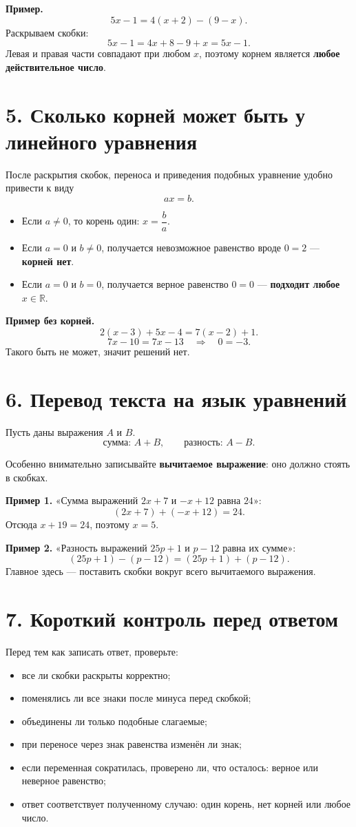 \documentclass[a4paper,12pt]{article}
\newcommand{\sectionline}{\par\vspace{0.1em}{\color{accent}\hrule height 0.6pt}\vspace{0.45em}}
\newcommand{\key}[1]{\textbf{\color{darkaccent}#1}}
\newcommand{\R}{\mathbb{R}}
\begin{document}
\textbf{Пример.}
\[
  5x-1=4(x+2)-(9-x).
\]
Раскрываем скобки:
\[
  5x-1=4x+8-9+x=5x-1.
\]
Левая и правая части совпадают при любом $x$, поэтому корнем является \key{любое действительное число}.

\section*{5. Сколько корней может быть у линейного уравнения}
\sectionline

После раскрытия скобок, переноса и приведения подобных уравнение удобно привести к виду
\[
  ax=b.
\]

\begin{itemize}
  \item Если $a\ne0$, то корень один: $x=\dfrac{b}{a}$.
  \item Если $a=0$ и $b\ne0$, получается невозможное равенство вроде $0=2$ — \key{корней нет}.
  \item Если $a=0$ и $b=0$, получается верное равенство $0=0$ — \key{подходит любое $x\in\R$}.
\end{itemize}

\textbf{Пример без корней.}
\[
  2(x-3)+5x-4=7(x-2)+1.
\]
\[
  7x-10=7x-13 \quad\Rightarrow\quad 0=-3.
\]
Такого быть не может, значит решений нет.

\section*{6. Перевод текста на язык уравнений}
\sectionline

Пусть даны выражения $A$ и $B$.
\[
  \text{сумма: } A+B, \qquad \text{разность: } A-B.
\]

Особенно внимательно записывайте \key{вычитаемое выражение}: оно должно стоять в скобках.

\textbf{Пример 1.} «Сумма выражений $2x+7$ и $-x+12$ равна $24$»:
\[
  (2x+7)+(-x+12)=24.
\]
Отсюда $x+19=24$, поэтому $x=5$.

\textbf{Пример 2.} «Разность выражений $25p+1$ и $p-12$ равна их сумме»:
\[
  (25p+1)-(p-12)=(25p+1)+(p-12).
\]
Главное здесь — поставить скобки вокруг всего вычитаемого выражения.

\clearpage
\section*{7. Короткий контроль перед ответом}
\sectionline

Перед тем как записать ответ, проверьте:
\begin{itemize}
  \item все ли скобки раскрыты корректно;
  \item поменялись ли все знаки после минуса перед скобкой;
  \item объединены ли только подобные слагаемые;
  \item при переносе через знак равенства изменён ли знак;
  \item если переменная сократилась, проверено ли, что осталось: верное или неверное равенство;
  \item ответ соответствует полученному случаю: один корень, нет корней или любое число.
\end{itemize}
\end{document}
